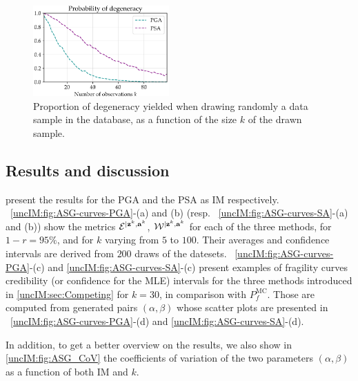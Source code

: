     \begin{figure}[!h]
        \centering
        \includegraphics[width=5.2cm]{figures/uncIM/degeneracy_proba.pdf}
        \caption{Proportion of degeneracy yielded when drawing randomly a data sample in the database, as a function of the size $k$ of the drawn sample.}\label{uncIM:fig:degeneracy-prob}
    \end{figure}
    
  
    
\subsection{Results and discussion}    
    
    present the results for the PGA and the PSA as IM respectively. ~\ref{uncIM:fig:ASG-curves-PGA}-(a) and (b) (resp. ~\ref{uncIM:fig:ASG-curves-SA}-(a) and (b)) show the metrics  $\mathcal{E}^{|\mathbf{z}^{k},\mathbf{a}^{k}}$, $\mathcal{W}^{|\mathbf{z}^{k},\mathbf{a}^{k}}$ for each of the three methods, for $1-r=95\%$, and for $k$ varying from $5$ to $100$. Their averages and confidence intervals are derived from $200$ draws of the datesets. ~\ref{uncIM:fig:ASG-curves-PGA}-(c) and \ref{uncIM:fig:ASG-curves-SA}-(c) present examples of fragility curves credibility (or confidence for the MLE) intervals for the three methods introduced in \cref{uncIM:sec:Competing} for $k = 30$, in comparison with $P_f^{\mathrm{MC}}$. 
   Those are computed from generated pairs $(\alpha,\beta)$ whose scatter plots are presented in ~\ref{uncIM:fig:ASG-curves-PGA}-(d) and \ref{uncIM:fig:ASG-curves-SA}-(d).
   
   In addition, to get a better overview on the results, we also show in \cref{uncIM:fig:ASG_CoV} the coefficients of variation of the two parameters $(\alpha , \beta)$ as a function of both IM and $k$.
   
